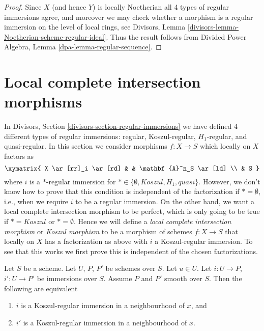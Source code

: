 \begin{proof}
Since $X$ (and hence $Y$) is locally Noetherian all 4 types of regular
immersions agree, and moreover we may check whether a morphism is a
regular immersion on the level of local rings, see
Divisors, Lemma \ref{divisors-lemma-Noetherian-scheme-regular-ideal}.
Thus the result follows from
Divided Power Algebra, Lemma \ref{dpa-lemma-regular-sequence}.
\end{proof}









\section{Local complete intersection morphisms}
\label{section-lci}

\noindent
In
Divisors, Section \ref{divisors-section-regular-immersions}
we have defined 4 different types of regular immersions: regular,
Koszul-regular, $H_1$-regular, and quasi-regular. In this section
we consider morphisms $f : X \to S$ which locally on $X$ factors as
$$
\xymatrix{
X \ar[rr]_i \ar[rd] & & \mathbf{A}^n_S \ar[ld] \\
& S
}
$$
where $i$ is a $*$-regular immersion for
$* \in \{\emptyset, Koszul, H_1, quasi\}$.
However, we don't know how to prove that this condition is independent
of the factorization if $* = \emptyset$, i.e., when we require $i$ to
be a regular immersion. On the other hand, we want a
local complete intersection morphism to be perfect, which is only
going to be true if $* = Koszul$ or $* = \emptyset$. Hence we will define a
{\it local complete intersection morphism} or
{\it Koszul morphism} to be a morphism of schemes $f : X \to S$
that locally on $X$ has a factorization as above with $i$ a Koszul-regular
immersion. To see that this works we first prove this is independent
of the chosen factorizations.

\begin{lemma}
\label{lemma-koszul-independence-factorization}
Let $S$ be a scheme. Let $U$, $P$, $P'$ be schemes over $S$.
Let $u \in U$. Let $i : U \to P$, $i' : U \to P'$ be immersions over $S$.
Assume $P$ and $P'$ smooth over $S$. Then the following are equivalent
\begin{enumerate}
\item $i$ is a Koszul-regular immersion in a neighbourhood of $x$, and
\item $i'$ is a Koszul-regular immersion in a neighbourhood of $x$.
\end{enumerate}
\end{lemma}

